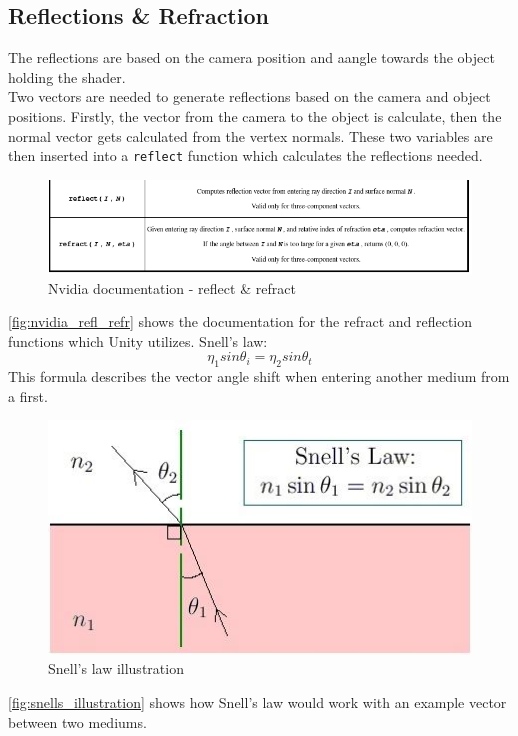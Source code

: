 \documentclass{article}
\begin{document}
\subsection{Reflections \& Refraction}
\label{sec:refl_refr}
The reflections are based on the camera position and aangle towards the object holding the shader.\\

Two vectors are needed to generate reflections based on the camera and object positions. Firstly, the vector from the camera to the object is calculate, then the normal vector gets calculated from the vertex normals. These two variables are then inserted into a \texttt{reflect} function which calculates the reflections needed.
\begin{figure}[H]
    \centering
    \includegraphics[width=\textwidth]{img/nvidia}
	\caption{Nvidia documentation - reflect \& refract}
    \label{fig:nvidia_refl_refr}
\end{figure}
\autoref{fig:nvidia_refl_refr} shows the documentation for the refract and reflection functions which Unity utilizes.
Snell's law:
$$ \eta_1 sin\theta_i = \eta_2 sin\theta_t $$
This formula describes the vector angle shift when entering another medium from a first.
\begin{figure}[H]
    \centering
	\includegraphics[width=.75\textwidth]{img/snell}
	\caption{Snell's law illustration\protect\footnotemark}
    \label{fig:snells_illustration}
\end{figure}
\autoref{fig:snells_illustration} shows how Snell's law would work with an example vector between two mediums.
\end{document}
